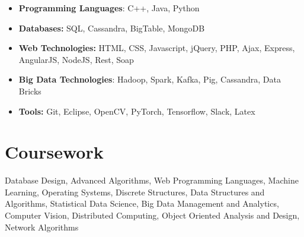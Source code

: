 \documentclass[letterpaper,11pt]{article}
\begin{document}
\begin{itemize}[noitemsep,nolistsep,leftmargin=*]


\item \textbf{Programming Languages}: C++, Java, Python
\item \textbf{Databases:} SQL, Cassandra, BigTable, MongoDB
\item \textbf{Web Technologies:} HTML, CSS, Javascript, jQuery, PHP, Ajax, Express, AngularJS, NodeJS, Rest, Soap
 \item \textbf{Big Data Technologies}: Hadoop, Spark, Kafka, Pig, Cassandra, Data Bricks
\item \textbf{Tools:} Git, Eclipse, OpenCV,  PyTorch, Tensorflow, Slack, Latex
  \end{itemize}
 

  
  
    
   \section{Coursework}
Database Design, Advanced Algorithms, Web Programming Languages, Machine Learning, Operating Systems,  Discrete Structures, Data Structures and Algorithms,  Statistical Data Science, Big Data Management and Analytics, Computer Vision, Distributed Computing, Object Oriented Analysis and Design,  Network Algorithms
  

  
\end{document}
